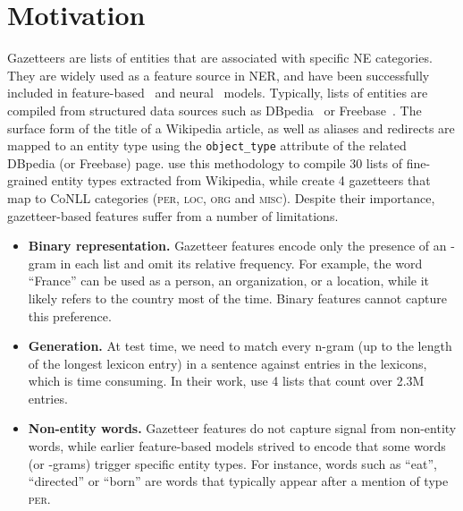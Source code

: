 \documentclass[11pt]{article}
\newcommand{\per}{\textsc{per}}
\newcommand{\loc}{\textsc{loc}}
\newcommand{\org}{\textsc{org}}
\newcommand{\misc}{\textsc{misc}}
\begin{document}
\section{Motivation}
	\label{sec:motivation}
	
	Gazetteers are lists of entities that are associated with specific NE categories. They are widely used as a feature source in NER, and have been successfully included in  feature-based~\cite{ratinov2009design} and neural~\cite{chiu2015named} models. Typically, lists of entities are compiled from structured data sources such as DBpedia~\cite{auer2007dbpedia} or Freebase~\cite{Bollacker:2008}. The surface form of the title of a Wikipedia article, as well as aliases and redirects are mapped to an entity type using the \texttt{object\_type} attribute of the related DBpedia (or Freebase) page.  use this methodology to compile 30 lists of fine-grained entity types extracted from Wikipedia, while  create 4 gazetteers that map to CoNLL categories (\per, \loc, \org{} and \misc). Despite their importance, gazetteer-based features suffer from a number of limitations.
	
	
	\begin{itemize}
		
		\item \textbf{Binary representation.} Gazetteer features encode only the presence of an -gram in each list and omit its relative frequency. For example, the word \enquote{France} can be used as a person, an organization, or a location, while it likely refers to the country most of the time. Binary features cannot capture this preference. 
		
		\item \textbf{Generation.} At test time, we need to match every n-gram (up to the length of the longest lexicon entry) in a sentence against entries in the lexicons, which is time consuming. In their work,  use 4 lists that count over 2.3M entries.
		
\item \textbf{Non-entity words.}	Gazetteer features do not capture signal from non-entity words, while earlier feature-based models strived to encode  that some words (or -grams) trigger specific entity types.  For instance, words such as \enquote{eat}, \enquote{directed} or \enquote{born} are words that typically appear after a mention of type \per.
		
	\end{itemize}
	
\end{document}
